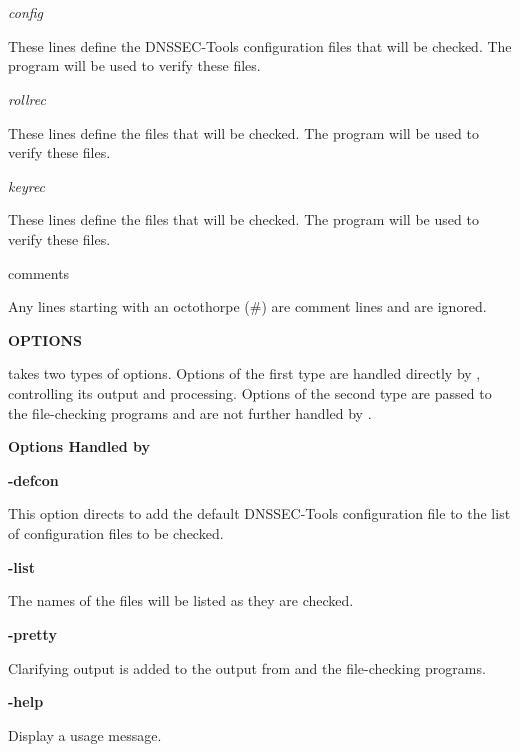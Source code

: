 \begin{description}

\item {\it config}\verb" "

These lines define the DNSSEC-Tools configuration files that will be checked.
The  program will be used to verify these files.

\item {\it rollrec}\verb" "

These lines define the  files that will be checked.
The  program will be used to verify these files.

\item {\it keyrec}\verb" "

These lines define the  files that will be checked.
The  program will be used to verify these files.

\item comments\verb" "

Any lines starting with an octothorpe (\#) are comment lines and are ignored.

\end{description}

{\bf OPTIONS}

 takes two types of options.  Options of the first type are handled 
directly by , controlling its output and processing.  Options of the
second type are passed to the file-checking programs and are not further
handled by .

{\bf Options Handled by }

\begin{description}

\item {\bf -defcon}\verb" "

This option directs  to add the default DNSSEC-Tools configuration
file to the list of configuration files to be checked.

\item {\bf -list}\verb" "

The names of the files will be listed as they are checked.

\item {\bf -pretty}\verb" "

Clarifying output is added to the output from  and the
file-checking programs.

\item {\bf -help}\verb" "

Display a usage message.

\end{description}

